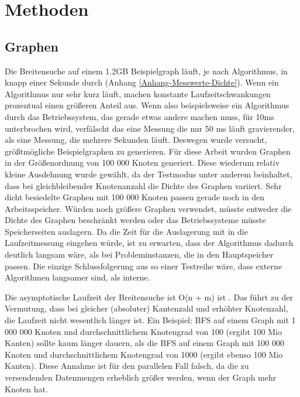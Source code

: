 
\chapter{Methoden} %
\label{cha:methoden}

\section{Graphen} %
\label{sec:graphen}
Die Breitensuche auf einem 1.2GB Beispielgraph läuft, je nach Algorithmus, in knapp einer Sekunde durch (Anhang \ref{Anhang-Messwerte-Dichte}). Wenn ein Algorithmus nur sehr kurz läuft, machen konstante Laufzeitschwankungen prozentual einen größeren Anteil aus. Wenn also beispielsweise ein Algorithmus durch das Betriebssystem, das gerade etwas andere machen muss, für 10ms unterbrochen wird, verfälscht das eine Messung die nur 50 ms läuft gravierender, als eine Messung, die mehrere Sekunden läuft. Deswegen wurde versucht, größtmögliche Beispielgraphen zu generieren. Für diese Arbeit wurden Graphen in der Größenordnung von 100 000 Knoten generiert. Diese wiederum relativ kleine Ausdehnung wurde gewählt, da der Testmodus unter anderem beinhaltet, dass bei gleichbleibender Knotenanzahl die Dichte des Graphen variiert. Sehr dicht besiedelte Graphen mit 100 000 Knoten passen gerade noch in den Arbeitsspeicher. Würden noch größere Graphen verwendet, müsste entweder die Dichte des Graphen beschränkt werden oder das Betriebssysteme müsste Speicherseiten auslagern. Da die Zeit für die Auslagerung mit in die Laufzeitmessung eingehen würde, ist zu erwarten, dass der Algorithmus dadurch deutlich langsam wäre, als bei Probleminstanzen, die in den Hauptspeicher passen. Die einzige Schlussfolgerung aus so einer Testreihe wäre, dass externe Algorithmen langsamer sind, als interne. 

Die asymptotische Laufzeit der Breitensuche ist O(n + m) ist \cite{SWB-283374373}. Das führt zu der Vermutung, dass bei gleicher (absoluter) Kantenzahl und erhöhter Knotenzahl, die Laufzeit nicht wesentlich länger ist. Ein Beispiel: BFS auf einem Graph mit 1 000 000 Knoten und durchschnittlichem Knotengrad von 100 (ergibt 100 Mio Kanten) sollte kaum länger dauern, als die BFS auf einem Graph mit 100 000 Knoten und durchschnittlichem Knotengrad von 1000 (ergibt ebenso 100 Mio Kanten). Diese Annahme ist für den parallelen Fall falsch, da die zu versendenden Datenmengen erheblich größer werden, wenn der Graph mehr Knoten hat.

